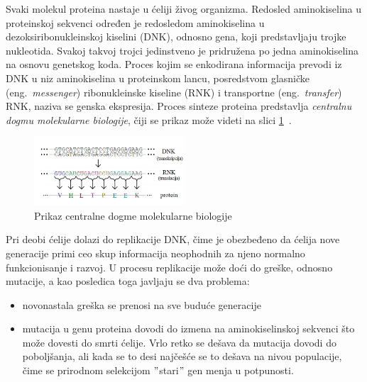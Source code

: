 Svaki molekul proteina nastaje u ćeliji živog organizma. Redosled aminokiselina u proteinskoj sekvenci određen je redosledom aminokiselina u dezoksiribonukleinskoj kiselini (DNK), odnosno gena, koji predstavljaju trojke nukleotida. Svakoj takvoj trojci jedinstveno je pridružena po jedna aminokiselina na osnovu genetskog koda. Proces kojim se enkodirana informacija prevodi iz DNK u niz aminokiselina u proteinskom lancu, posredstvom glasničke (eng.~{\em messenger}) ribonukleinske kiseline (RNK) i transportne (eng.~{\em transfer}) RNK, naziva se genska ekspresija. Proces sinteze proteina predstavlja \textit{centralnu dogmu molekularne biologije}, čiji se prikaz može videti na slici \ref{fig:dogma}~\cite{JKd}.

\begin{figure}[H]
	\centering
    \includegraphics[width=0.5\textwidth]{Figures/BO/dogma.png}
    \caption{Prikaz centralne dogme molekularne biologije~\cite{JKd}}
    \label{fig:dogma}
\end{figure}

Pri deobi ćelije dolazi do replikacije DNK, čime je obezbeđeno da ćelija nove generacije primi ceo skup informacija neophodnih za njeno normalno funkcionisanje i razvoj. U procesu replikacije može doći do greške, odnosno mutacije, a kao posledica toga javljaju se dva problema:
\begin{itemize}
\item novonastala greška se prenosi na sve buduće generacije
\item  mutacija u genu proteina dovodi do izmena na aminokiselinskoj sekvenci što može dovesti do smrti ćelije. Vrlo retko se dešava da mutacija dovodi do poboljšanja, ali kada se to desi najčešće se to dešava na nivou populacije, čime se prirodnom selekcijom $"$stari$"$ gen menja u potpunosti. 
\end{itemize} ~\citep{Principi}



